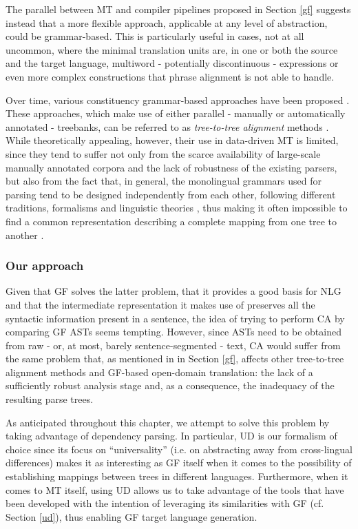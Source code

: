 The parallel between MT and compiler pipelines proposed in Section \ref{gf} suggests instead that a more flexible approach, applicable at any level of abstraction, could be grammar-based. 
This is particularly useful in cases, not at all uncommon, where the minimal translation units are, in one or both the source and the target language, multiword - potentially discontinuous - expressions or even more complex constructions that phrase alignment is not able to handle. \smallskip 

Over time, various constituency grammar-based approaches have been proposed \cite{t2t1, t2t2}. These approaches, which make use of either parallel - manually or automatically annotated - treebanks, can be referred to as \textit{tree-to-tree alignment} methods \cite{bitext}. While theoretically appealing, however, their use in data-driven MT is limited, since they tend to suffer not only from the scarce availability of large-scale manually annotated corpora and the lack of robustness of the existing parsers, but also from the fact that, in general, the monolingual grammars used for parsing tend to be designed independently from each other, following different traditions, formalisms and linguistic theories \cite{nlphandbook}, thus making it often impossible to find a common representation describing a complete mapping from one tree to another \cite{bitext}.

\subsubsection{Our approach} \label{ourapproach}
Given that GF solves the latter problem, that it provides a good basis for NLG and that the intermediate representation it makes use of preserves all the syntactic information present in a sentence, the idea of trying to perform CA by comparing GF ASTs seems tempting. However, since ASTs need to be obtained from raw - or, at most, barely sentence-segmented - text, CA would suffer from the same problem that, as mentioned in in Section \ref{gf}, affects other tree-to-tree alignment methods and GF-based open-domain translation: the lack of a sufficiently robust analysis stage and, as a consequence, the inadequacy of the resulting parse trees. \smallskip

As anticipated throughout this chapter, we attempt to solve this problem by taking advantage of dependency parsing. In particular, UD is our formalism of choice since its focus on ``universality'' (i.e. on abstracting away from cross-lingual differences) makes it as interesting as GF itself when it comes to the possibility of establishing mappings between trees in different languages. Furthermore, when it comes to MT itself, using UD allows us to take advantage of the tools that have been developed with the intention of leveraging its similarities with GF (cf. Section \ref{ud}), thus enabling GF target language generation. \smallskip

